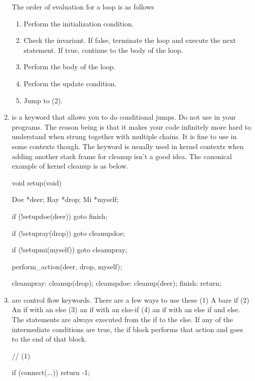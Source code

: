 \begin{enumerate}
\begin{code}[language=C]
{}
\end{code}

The order of evaluation for a  loop is as follows

\begin{enumerate}
\item Perform the initialization condition.
\item Check the invariant. If false, terminate the loop and execute the next statement. If true, continue to the body of the loop.
\item Perform the body of the loop.
\item Perform the update condition.
\item Jump to (2).
\end{enumerate}

\item {} is a keyword that allows you to do conditional jumps. Do not use  in your programs. The reason being is that it makes your code infinitely more hard to understand when strung together with multiple chains. It is fine to use in some contexts though. The keyword is usually used in kernel contexts when adding another stack frame for cleanup isn't a good idea. The canonical example of kernel cleanup is as below.

\begin{code}[language=C]
void setup(void) {
  Doe *deer;
  Ray *drop;
  Mi *myself;

  if (!setupdoe(deer)) {
    goto finish;
  } 

  if (!setupray(drop)) {
    goto cleanupdoe;
  } 

  if (!setupmi(myself)) {
    goto cleanupray;
  }

  perform_action(deer, drop, myself);

cleanupray:
  cleanup(drop);
cleanupdoe:
  cleanup(deer);
finish:
  return;
} 
\end{code}
\item {} are control flow keywords. There are a few ways to use these (1) A bare if (2) An if with an else (3) an if with an else-if (4) an if with an else if and else. The statements are always executed from the if to the else. If any of the intermediate conditions are true, the if block performs that action and goes to the end of that block.

\begin{code}[language=C]
// (1)

if (connect(...))
  return -1;


\end{code}
\end{enumerate}
